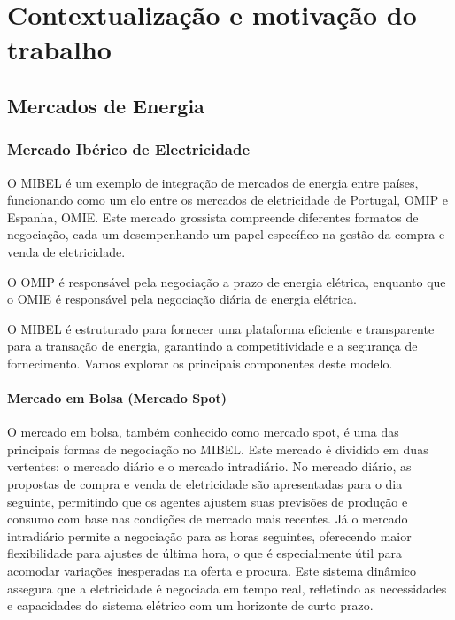\section{Contextualização e motivação do trabalho\label{ch:contextos}}

\subsection{Mercados de Energia}

\subsubsection{Mercado Ibérico de Electricidade \label{se:mibel}}

O \gls{MIBEL} é um exemplo de integração de mercados de energia entre países, funcionando como um elo entre os mercados de eletricidade de Portugal, \gls{OMIP} e Espanha, \gls{OMIE}. Este mercado grossista compreende diferentes formatos de negociação, cada um desempenhando um papel específico na gestão da compra e venda de eletricidade.\par
O \gls{OMIP} é responsável pela negociação a prazo de energia elétrica, enquanto que o  \gls{OMIE} é responsável pela negociação diária de energia elétrica.\par
O \gls{MIBEL} é estruturado para fornecer uma plataforma eficiente e transparente para a transação de energia, garantindo a competitividade e a segurança de fornecimento. Vamos explorar os principais componentes deste modelo.\par


\paragraph{Mercado em Bolsa (Mercado Spot) \label{se:mercado_bolsa}}
\text{ }  \par
O mercado em bolsa, também conhecido como mercado spot, é uma das principais formas de negociação no \gls{MIBEL}. Este mercado é dividido em duas vertentes: o mercado diário e o mercado intradiário. No mercado diário, as propostas de compra e venda de eletricidade são apresentadas para o dia seguinte, permitindo que os agentes ajustem suas previsões de produção e consumo com base nas condições de mercado mais recentes. Já o mercado intradiário permite a negociação para as horas seguintes, oferecendo maior flexibilidade para ajustes de última hora, o que é especialmente útil para acomodar variações inesperadas na oferta e procura. Este sistema dinâmico assegura que a eletricidade é negociada em tempo real, refletindo as necessidades e capacidades do sistema elétrico com um horizonte de curto prazo.\par


